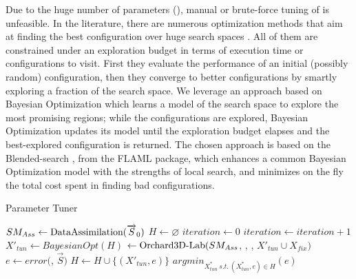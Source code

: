 Due to the huge number of parameters (), manual or brute-force tuning of \olab{} is unfeasible.
In the literature, there are numerous optimization methods that aim at finding the best configuration over huge search spaces \cite{luo2017automating}.
All of them are constrained under an exploration budget in terms of execution time or configurations to visit.
First they evaluate the performance of an initial (possibly random) configuration, then they converge to better configurations by smartly exploring a fraction of the search space.
We leverage an approach based on Bayesian Optimization \cite{frazier2018tutorial} which learns a model of the search space to explore the most promising regions; while the configurations are explored, Bayesian Optimization updates its model until the exploration budget elapses and the best-explored configuration is returned.
The chosen approach is based on the Blended-search \cite{wang2021flaml}, from the FLAML package, which enhances a common Bayesian Optimization model with the strengths of local search, and minimizes on the fly the total cost spent in finding bad configurations.

\begin{algorithm}[t]
\caption{Parameter Tuner}
\footnotesize
\begin{algorithmic}[1]
    \State $SM_{Ass} \gets \textup{DataAssimilation}(\overrightarrow{S}_{0})$ 
    \State $H \gets \varnothing$ 
    \State $iteration \gets 0$ 
     
        \State $iteration \gets iteration + 1$ 
        \State $X'_{tun} \gets BayesianOpt(H)$ 
        \State \SMt $\gets \textup{Orchard3D-Lab{}}(SM_{Ass}$, \Wt, \It, $X'_{tun} \cup X_{fix})$ 
        \State $e \gets error($\SMt, $\overrightarrow{S})$ 
        \State $H \gets H \cup \{(X'_{tun}, e)\}$ 
    \EndWhile
    \State \Return $argmin_{X^*_{tun}~s.t.~(X^*_{tun}, e) \in H}{(e)}$ 
\end{algorithmic}
\label{alg:bayesian-optimization}
\end{algorithm}


